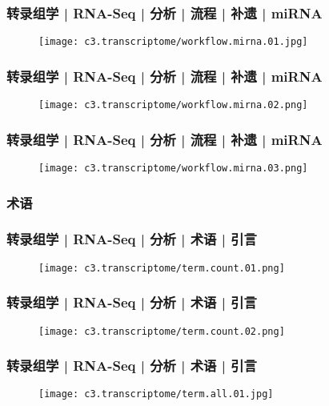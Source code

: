 \begin{frame}
  \frametitle{转录组学 | RNA-Seq | 分析 | 流程 | 补遗 | miRNA}
  \begin{figure}
    \centering
    \texttt{[image: c3.transcriptome/workflow.mirna.01.jpg]}
  \end{figure}
\end{frame}

\begin{frame}
  \frametitle{转录组学 | RNA-Seq | 分析 | 流程 | 补遗 | miRNA}
  \begin{figure}
    \centering
    \texttt{[image: c3.transcriptome/workflow.mirna.02.png]}
  \end{figure}
\end{frame}

\begin{frame}
  \frametitle{转录组学 | RNA-Seq | 分析 | 流程 | 补遗 | miRNA}
  \begin{figure}
    \centering
    \texttt{[image: c3.transcriptome/workflow.mirna.03.png]}
  \end{figure}
\end{frame}

\subsubsection{术语}
\begin{frame}
  \frametitle{转录组学 | RNA-Seq | 分析 | 术语 | 引言}
  \begin{figure}
    \centering
    \texttt{[image: c3.transcriptome/term.count.01.png]}
  \end{figure}
\end{frame}

\begin{frame}
  \frametitle{转录组学 | RNA-Seq | 分析 | 术语 | 引言}
  \begin{figure}
    \centering
    \texttt{[image: c3.transcriptome/term.count.02.png]}
  \end{figure}
\end{frame}

\begin{frame}
  \frametitle{转录组学 | RNA-Seq | 分析 | 术语 | 引言}
  \begin{figure}
    \centering
    \texttt{[image: c3.transcriptome/term.all.01.jpg]}
  \end{figure}
\end{frame}

